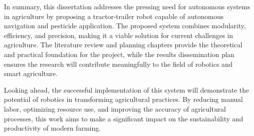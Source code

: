 In summary, this dissertation addresses the pressing need for autonomous systems 
in agriculture by proposing a tractor-trailer robot capable of autonomous 
navigation and pesticide application. The proposed system combines modularity, 
efficiency, and precision, making it a viable solution for current challenges in 
agriculture. The literature review and planning chapters provide the theoretical 
and practical foundation for the project, while the results dissemination plan 
ensures the research will contribute meaningfully to the field of robotics and 
smart agriculture.

Looking ahead, the successful implementation of this system will demonstrate 
the potential of robotics in transforming agricultural practices. By reducing 
manual labor, optimizing resource use, and improving the accuracy of agricultural 
processes, this work aims to make a significant impact on the sustainability and 
productivity of modern farming.

